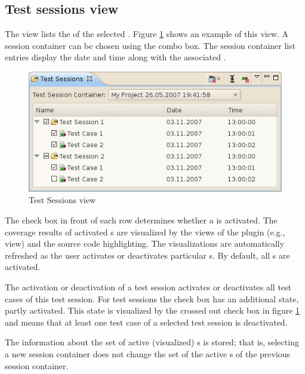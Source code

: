 \subsection{Test sessions view} \label{ui:Test sessions view}
The  view lists the  of the selected . Figure \ref{ui_fg:Session view} shows an example of this view. A session container can be chosen using the combo box. The session container list entries display the date and time along with the associated .
\begin{figure}[hbtp]
 \centering
 \includegraphics[]{images/Test_Case_Administration_View/Session_View.png}
 \caption{Test Sessions view}
 \label{ui_fg:Session view}
\end{figure}
\par
The check box in front of each row determines whether a  is activated. The coverage results of activated s are visualized by the views of the plugin (e.g.,  view) and the source code highlighting. The visualizations are automatically refreshed as the user activates or deactivates particular s. By default, all s are activated.
\par
The activation or deactivation of a test session activates or deactivates all test cases of this test session. For test sessions the check box has an additional state, partly activated. This state is visualized by the crossed out check box in figure \ref{ui_fg:Session view} and means that at least one test case of a selected test session is deactivated. 
\par
The information about the set of active (visualized) s is stored; that is, selecting a new session container does not change the set of the active s of the previous session container.
\par
